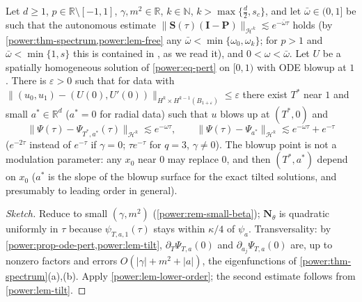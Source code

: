 \begin{theorem}\label{power:thm-lower-order}
Let $d\ge1$, $p\in\mathbb R\setminus[-1,1]$, $\gamma,m^2\in\mathbb R$, $k\in\mathbb N$,
$k>\max\{\frac d2,s_c\}$, and let $\bar\omega\in(0,1]$ be such that the autonomous estimate
$\|\mathbf S(\tau)(\mathbf I-\mathbf P)\|_{\mathcal H^k}\lesssim e^{-\bar\omega\tau}$ holds (by
\cref{power:thm-spectrum,power:lem-free} any $\bar\omega<\min\{\omega_0,\omega_k\}$; for $p>1$
and $\bar\omega<\min\{1,s\}$ this is contained in \cite{Ostermann2024}, as we read
it), and $0<\omega<\bar\omega$. Let $U$ be a spatially homogeneous solution of \eqref{power:eq-pert} on
$[0,1)$ with ODE blowup at $1$. There is $\varepsilon>0$ such that for data with
$\|(u_0,u_1)-(U(0),U'(0))\|_{H^k\times H^{k-1}(B_{1+\varepsilon})}\le\varepsilon$ there exist
$T^*$ near $1$ and small $a^*\in\mathbb R^d$ ($a^*=0$ for radial data) such that
$u$ blows up at $(T^*,0)$ and
\[
  \|\Psi(\tau)-\Psi_{T^*,a^*}(\tau)\|_{\mathcal H^k}\lesssim e^{-\omega\tau},\qquad
  \|\Psi(\tau)-\Psi_{a^*}\|_{\mathcal H^k}\lesssim e^{-\omega\tau}+e^{-\tau}
\]
($e^{-2\tau}$ instead of $e^{-\tau}$ if $\gamma=0$; $\tau e^{-\tau}$ for $q=3$,
$\gamma\neq0$). The blowup point is not a modulation parameter: any $x_0$ near $0$
may replace $0$, and then $(T^*,a^*)$ depend on $x_0$ ($a^*$ is the slope of the
blowup surface for the exact tilted solutions, and presumably to leading order
in general).
\end{theorem}
\begin{proof}[Sketch]
Reduce to small $(\gamma,m^2)$ (\cref{power:rem-small-beta}); $\mathbf N_\theta$ is
quadratic uniformly in $\tau$ because $\psi_{T,a,1}(\tau)$ stays within $\kappa/4$ of
$\psi_a$. Transversality: by \cref{power:prop-ode-pert,power:lem-tilt},
$\partial_T\Psi_{T,a}(0)$ and $\partial_{a_j}\Psi_{T,a}(0)$ are, up to nonzero factors and
errors $O(|\gamma|+m^2+|a|)$, the eigenfunctions of
\cref{power:thm-spectrum}(a),(b). Apply \cref{power:lem-lower-order}; the second
estimate follows from \cref{power:lem-tilt}.
\end{proof}

